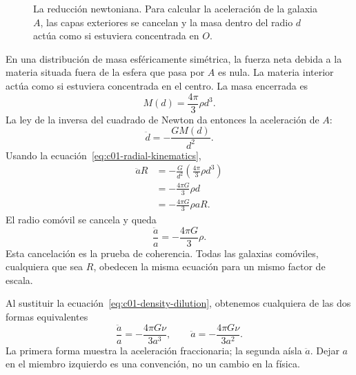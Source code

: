 \begin{figure}[ht]
\centering
{}
\caption{La reducción newtoniana. Para calcular la aceleración de la galaxia \(A\), las capas exteriores se cancelan y la masa dentro del radio \(d\) actúa como si estuviera concentrada en \(O\).}
\label{fig:c01-newton-sphere}
\end{figure}

En una distribución de masa esféricamente simétrica, la fuerza neta debida a la materia situada fuera de la esfera que pasa por \(A\) es nula. La materia interior actúa como si estuviera concentrada en el centro. La masa encerrada es
\begin{equation}
M(d)=\frac{4\pi}{3}\rho d^3.
\label{eq:c01-enclosed-mass}
\end{equation}
La ley de la inversa del cuadrado de Newton da entonces la aceleración de \(A\):
\begin{equation}
\ddot d=-\frac{GM(d)}{d^2}.
\end{equation}
Usando la ecuación~\eqref{eq:c01-radial-kinematics},
\begin{align}
\ddot a R
&=-\frac{G}{d^2}\left(\frac{4\pi}{3}\rho d^3\right) \\
&=-\frac{4\pi G}{3}\rho d \\
&=-\frac{4\pi G}{3}\rho aR.
\end{align}
El radio comóvil se cancela y queda
\begin{equation}
\boxed{\frac{\ddot a}{a}=-\frac{4\pi G}{3}\rho.}
\label{eq:c01-acceleration}
\end{equation}
Esta cancelación es la prueba de coherencia. Todas las galaxias comóviles, cualquiera que sea \(R\), obedecen la misma ecuación para un mismo factor de escala.

Al sustituir la ecuación~\eqref{eq:c01-density-dilution}, obtenemos cualquiera de las dos formas equivalentes
\begin{equation}
\frac{\ddot a}{a}=-\frac{4\pi G\nu}{3a^3},
\qquad
\ddot a=-\frac{4\pi G\nu}{3a^2}.
\label{eq:c01-acceleration-nu}
\end{equation}
La primera forma muestra la aceleración fraccionaria; la segunda aísla \(\ddot a\). Dejar \(a\) en el miembro izquierdo es una convención, no un cambio en la física.

